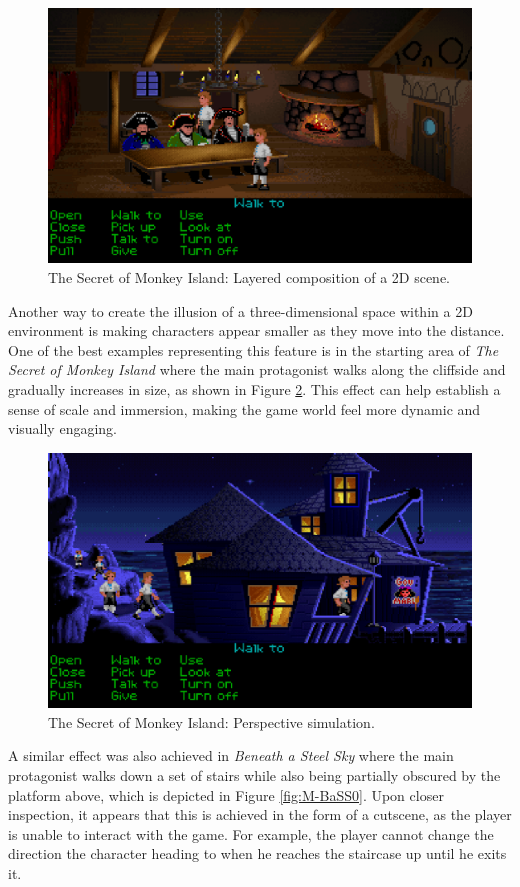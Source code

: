 \begin{figure}[H]
\centering
\includegraphics[width=.75\linewidth]{img/M-TSoMI0.png}
\caption{The Secret of Monkey Island: Layered composition of a 2D scene.}
\label{fig:M-TSoMI0}
\end{figure}

Another way to create the illusion of a three-dimensional space within a 2D environment is making characters appear smaller as they move into the distance. One of the best examples representing this feature is in the starting area of \textit{The Secret of Monkey Island} where the main protagonist walks along the cliffside and gradually increases in size, as shown in Figure \ref{fig:M-TSoMI}. This effect can help establish a sense of scale and immersion, making the game world feel more dynamic and visually engaging. 

\begin{figure}[H]
\centering
\includegraphics[width=.75\linewidth]{img/M-TSoMI.png}
\caption{The Secret of Monkey Island: Perspective simulation.}
\label{fig:M-TSoMI}
\end{figure}

A similar effect was also achieved in \textit{Beneath a Steel Sky} where the main protagonist walks down a set of stairs while also being partially obscured by the platform above, which is depicted in Figure \ref{fig:M-BaSS0}. Upon closer inspection, it appears that this is achieved in the form of a cutscene, as the player is unable to interact with the game. For example, the player cannot change the direction the character heading to when he reaches the staircase up until he exits it. 



